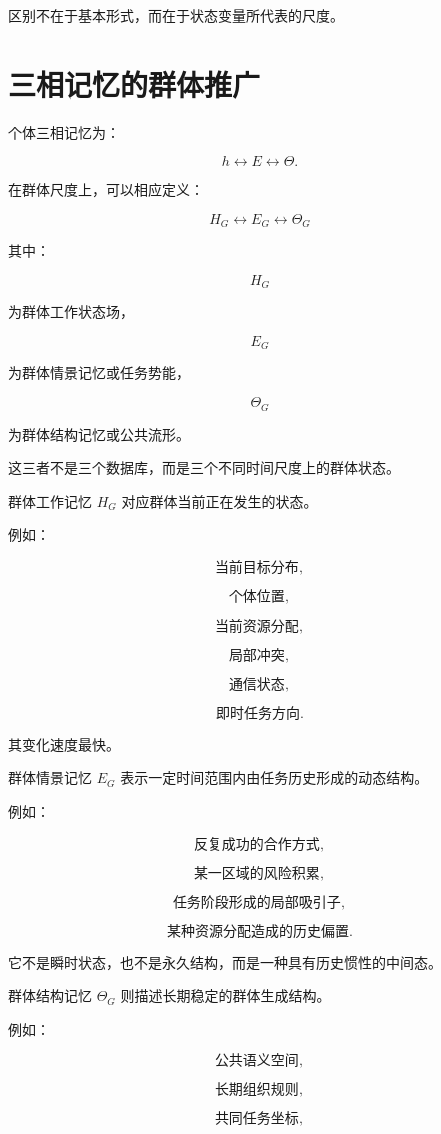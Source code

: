 区别不在于基本形式，而在于状态变量所代表的尺度。


\section{三相记忆的群体推广}

个体三相记忆为：

\[
h
\leftrightarrow
E
\leftrightarrow
\Theta.
\]

在群体尺度上，可以相应定义：

\[
\boxed{
H_G
\leftrightarrow
E_G
\leftrightarrow
\Theta_G
}
\]

其中：

\[
H_G
\]

为群体工作状态场，

\[
E_G
\]

为群体情景记忆或任务势能，

\[
\Theta_G
\]

为群体结构记忆或公共流形。

这三者不是三个数据库，而是三个不同时间尺度上的群体状态。

群体工作记忆 $H_G$ 对应群体当前正在发生的状态。

例如：

\[
\text{当前目标分布},
\]

\[
\text{个体位置},
\]

\[
\text{当前资源分配},
\]

\[
\text{局部冲突},
\]

\[
\text{通信状态},
\]

\[
\text{即时任务方向}.
\]

其变化速度最快。

群体情景记忆 $E_G$ 表示一定时间范围内由任务历史形成的动态结构。

例如：

\[
\text{反复成功的合作方式},
\]

\[
\text{某一区域的风险积累},
\]

\[
\text{任务阶段形成的局部吸引子},
\]

\[
\text{某种资源分配造成的历史偏置}.
\]

它不是瞬时状态，也不是永久结构，而是一种具有历史惯性的中间态。

群体结构记忆 $\Theta_G$ 则描述长期稳定的群体生成结构。

例如：

\[
\text{公共语义空间},
\]

\[
\text{长期组织规则},
\]

\[
\text{共同任务坐标},
\]

